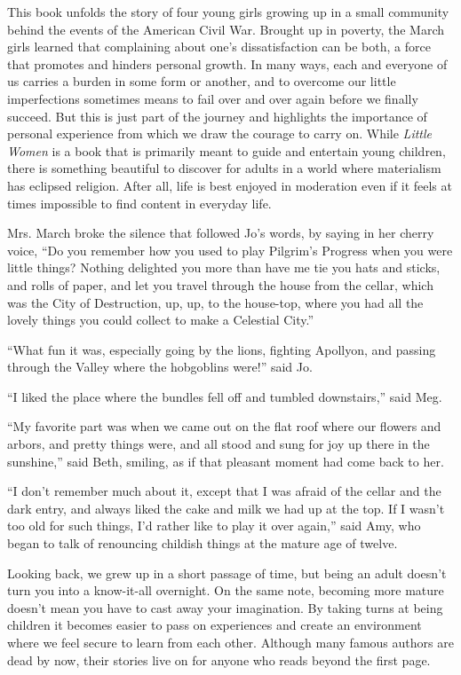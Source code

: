 This book unfolds the story of four young girls growing up in a small community 
behind the events of the American Civil War. Brought up in poverty, the March 
girls learned that complaining about one’s dissatisfaction can be both, a force 
that promotes and hinders personal growth. In many ways, each and everyone of us 
carries a burden in some form or another, and to overcome our little 
imperfections sometimes means to fail over and over again before we finally 
succeed. But this is just part of the journey and highlights the importance of 
personal experience from which we draw the courage to carry on. While 
\emph{Little Women} is a book that is primarily meant to guide and entertain 
young children, there is something beautiful to discover for adults in a world 
where materialism has eclipsed religion. After all, life is best enjoyed in 
moderation even if it feels at times impossible to find content in everyday 
life. 

\begin{displayquote}
Mrs. March broke the silence that followed Jo’s words, by saying in her cherry 
voice, “Do you remember how you used to play Pilgrim’s Progress when you were 
little things? Nothing delighted you more than have me tie you hats and sticks, 
and rolls of paper, and let you travel through the house from the cellar, which 
was the City of Destruction, up, up, to the house-top, where you had all the 
lovely things you could collect to make a Celestial City.”

“What fun it was, especially going by the lions, fighting Apollyon, and passing 
through the Valley where the hobgoblins were!” said Jo.

“I liked the place where the bundles fell off and tumbled downstairs,” said Meg.

“My favorite part was when we came out on the flat roof where our flowers and 
arbors, and pretty things were, and all stood and sung for joy up there in the 
sunshine,” said Beth, smiling, as if that pleasant moment had come back to her.

“I don’t remember much about it, except that I was afraid of the cellar and the 
dark entry, and always liked the cake and milk we had up at the top. If I wasn’t 
too old for such things, I’d rather like to play it over again,” said Amy, who 
began to talk of renouncing childish things at the mature age of twelve. 
\autocite[14]{alcott2014}
\end{displayquote}

Looking back, we grew up in a short passage of time, but being an adult doesn’t 
turn you into a know-it-all overnight. On the same note, becoming more mature 
doesn’t mean you have to cast away your imagination. By taking turns at being 
children it becomes easier to pass on experiences and create an environment 
where we feel secure to learn from each other. Although many famous authors are 
dead by now, their stories live on for anyone who reads beyond the first page.
